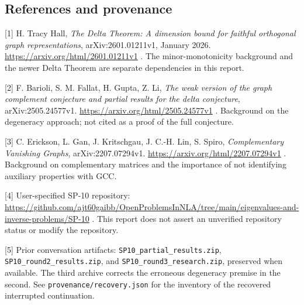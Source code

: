 \documentclass[
  10pt,
]{article}
\begin{document}
\subsection{References and provenance}\label{references-and-provenance}

{[}1{]} H. Tracy Hall, \emph{The Delta Theorem: A dimension bound for
faithful orthogonal graph representations}, arXiv:2601.01211v1, January
2026. \url{https://arxiv.org/html/2601.01211v1} . The minor-monotonicity
background and the newer Delta Theorem are separate dependencies in this
report.

{[}2{]} F. Barioli, S. M. Fallat, H. Gupta, Z. Li, \emph{The weak
version of the graph complement conjecture and partial results for the
delta conjecture}, arXiv:2505.24577v1.
\url{https://arxiv.org/html/2505.24577v1} . Background on the degeneracy
approach; not cited as a proof of the full conjecture.

{[}3{]} C. Erickson, L. Gan, J. Kritschgau, J. C.-H. Lin, S. Spiro,
\emph{Complementary Vanishing Graphs}, arXiv:2207.07294v1.
\url{https://arxiv.org/html/2207.07294v1} . Background on complementary
matrices and the importance of not identifying auxiliary properties with
GCC.

{[}4{]} User-specified SP-10 repository:
\url{https://github.com/ajt60gaibb/OpenProblemsInNLA/tree/main/eigenvalues-and-inverse-problems/SP-10}
. This report does not assert an unverified repository status or modify
the repository.

{[}5{]} Prior conversation artifacts:
\nolinkurl{SP10_partial_results.zip}, \nolinkurl{SP10_round2_results.zip},
and \nolinkurl{SP10_round3_research.zip}, preserved when available. The
third archive corrects the erroneous degeneracy premise in the second.
See \nolinkurl{provenance/recovery.json} for the inventory of the recovered
interrupted continuation.
\end{document}
